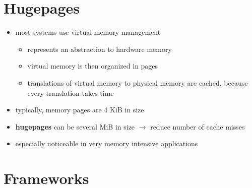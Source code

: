 \documentclass{meetings}
\begin{document}
\section{Hugepages}
\begin{itemize}
	\item most systems use virtual memory management
\begin{itemize}
	\item represents an abstraction to hardware memory
	\item virtual memory is then organized in pages
	\item translations of virtual memory to physical memory are cached, because every translation takes time
\end{itemize}
	\item typically, memory pages are 4 KiB in size
	\item \textbf{hugepages} can be several MiB in size $\rightarrow$ reduce number of cache misses
	\item especially noticeable in very memory intensive applications
\end{itemize}







\section{Frameworks}

\end{document}
